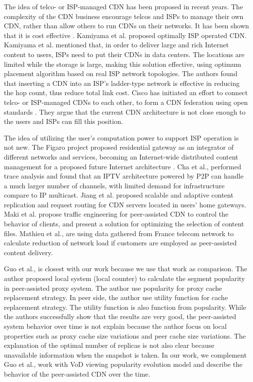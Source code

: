 \documentclass[conference]{IEEEtran}
\begin{document}
The idea of telco- or ISP-managed CDN has been proposed in recent years.  
The complexity of the CDN business encourage telcos and ISPs to manage their own CDN, rather than allow others to run CDNs on their networks.  
It has been shown that it is cost effective \cite{federation}\cite{norton2011internet}. 
Kamiyama et al. \cite{NoriakiKAMIYAMA2013} proposed optimally ISP operated CDN.
Kamiyama et al. mentioned that, in order to deliver large and rich Internet content to users, ISPs need to put their CDNs in data centers.  
The locations are limited while the storage is large, making this solution effective, using optimum placement algorithm based on real ISP network topologies.  
The authors found that inserting a CDN into an ISP's ladder-type network is effective in reducing the hop count, thus reduce total link cost.  
Cisco has initiated an effort to connect telco- or ISP-managed CDNs to each other, to form a CDN federation \cite{federation} using open standards \cite{cdni}.  
They argue that the current CDN architecture is not close enough to the users and ISPs can fill this position.

The idea of utilizing the user's computation power to support ISP operation is not new.  
The Figaro project \cite{figaro} proposed residential gateway as an integrator of different networks and services, becoming an Internet-wide distributed content management for a proposed future Internet architecture \cite{figaro}.  
Cha et al.,\cite{Cha:2008:NTP:1855641.1855646} performed trace analysis and found that an IPTV architecture powered by P2P can handle a much larger number of channels, with limited demand for infrastructure compare to IP multicast.  
Jiang et al. \cite{Jiang:2012:OMD:2413176.2413193} proposed scalable and adaptive content replication and request routing for CDN servers located in users' home gateways.  
Maki et al.\cite{NaoyaMAKI2012} propose traffic engineering for peer-assisted CDN to control the behavior of clients, and present a solution for optimizing the selection of content files.
Mathieu et al., \cite{6249305} are using data gathered from France telecom network to calculate reduction of network load if customers are employed as peer-assisted content delivery.

Guo et al., \cite{1613869} is closest with our work because we use that work as comparison.
The author proposed local system (local counter) to calculate the segment popularity in peer-assisted proxy system. 
The author use popularity for proxy cache replacement strategy. 
In peer side, the author use utility function for cache replacement strategy.  
The utility function is also function from popularity.
While the authors successfully show that the results are very good, the peer-assisted system behavior over time is not explain because the author focus on local properties such as proxy cache size variations and peer cache size variations.
The explanation of the optimal number of replicas is not also clear because unavailable information when the snapshot is taken.  
In our work, we complement Guo et al., \cite{1613869} work with VoD viewing popularity evolution model and describe the behavior of the peer-assisted CDN over the time.
\end{document}
